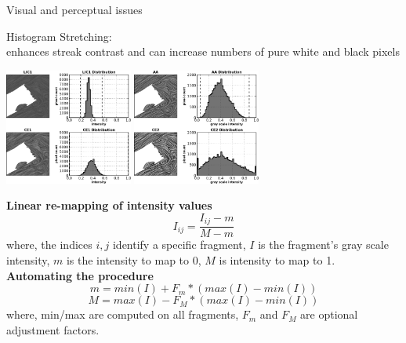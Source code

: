 \documentclass[notes]{beamer}
\begin{document}
\begin{frame}{Visual and perceptual issues}
  \begin{beamerboxesrounded}{Histogram Stretching:\\enhances streak contrast and can increase numbers of pure white and black pixels}
  \begin{center}
  \includegraphics[width=1.6535in]{gray-ce1-curves.png}\hspace{0.0125in}
  \includegraphics[width=1.6535in]{gray-ce2-curves.png}%
  \end{center}
  \vspace{-0.1in}
  {\bf \footnotesize  Linear re-mapping of intensity values}
  \scriptsize
  \begin{equation}
  I_{ij} = \frac{I_{ij} - m}{M - m}
  \end{equation}
  where, the indices $i,j$ identify a specific fragment, $I$ is the fragment's gray scale intensity, $m$ is the intensity to map to 0, $M$ is intensity to map to 1.\\
  {\bf \footnotesize Automating the procedure}
  \begin{equation}
  m = min(I) + F_{m} * ( max(I) - min(I) )
  \end{equation}
  \begin{equation}
  M = max(I) - F_{M} * ( max(I) - min(I) ) 
  \end{equation}
  where, min/max are computed on all fragments, $F_m$ and $F_M$ are optional adjustment factors.
  \end{beamerboxesrounded}
\end{frame}
\end{document}
